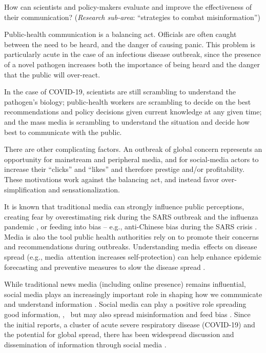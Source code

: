  How can scientists and policy-makers evaluate and improve the effectiveness of their communication? (\emph{Research sub-area}: ``strategies to combat misinformation'')


Public-health communication is a balancing act. Officials are often caught between the need to be heard, and the danger of causing panic. This problem is particularly acute in the case of an infectious disease outbreak, since the presence of a novel pathogen increases both the importance of being heard and the danger that the public will over-react. 

In the case of COVID-19, scientists are still scrambling to understand the pathogen's biology; public-health workers are scrambling to decide on the best recommendations and policy decisions given current knowledge at any given time; and the mass media is scrambling to understand the situation and decide how best to communicate with the public. 

There are other complicating factors. An outbreak of global concern represents an opportunity for mainstream and peripheral media, and for social-media actors to increase their ``clicks'' and ``likes'' and therefore prestige and/or profitability. These motivations work against the balancing act, and instead favor over-simplification and sensationalization.

It is known that traditional media can strongly influence public perceptions, creating fear by overestimating risk during the SARS outbreak \citep{BerrWhar07} and the influenza pandemic \citep{TchuDube11}, or feeding into bias -- e.g., anti-Chinese bias during the SARS crisis \citep{HuanLeun06}.  Media is also the tool public health authorities rely on to promote their concerns and recommendations during outbreaks.  Understanding media effects on disease spread (e.g., media attention increases self-protection) can help enhance epidemic forecasting and preventive measures to slow the disease spread \citep{KimFast19}.  

While traditional news media (including online presence) remains influential,  social media plays an increasingly important role in shaping how we communicate and understand information \citep{LiuSieg19}. Social media can play a positive role spreading good information, \cite{BascHill20, SunYang20,AhmeQuin18},  but may also spread misinformation and feed bias \citep{ChouOhA18, McKevanS19}.
Since the initial reports, a cluster of acute severe respiratory disease (COVID-19) and the potential for global spread, there has been widespread discussion and dissemination of information through social media \citep{?}.

